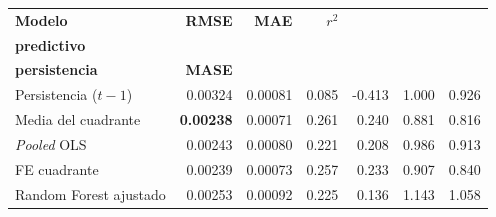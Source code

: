 \begin{tabular}{l r r r r r r}
\toprule
\textbf{Modelo} & \textbf{RMSE} & \textbf{MAE} & \textbf{$r^2$} & \makecell[c]{\textbf{$R^2$}\\\textbf{predictivo}} & \makecell[c]{\textbf{MAE rel.}\\\textbf{persistencia}} & \textbf{MASE} \\
\midrule
Persistencia ($t-1$) & 0.00324 & 0.00081 & 0.085 & -0.413 & 1.000 & 0.926 \\
Media del cuadrante & \textbf{0.00238} & 0.00071 & 0.261 & 0.240 & 0.881 & 0.816 \\
\emph{Pooled} OLS & 0.00243 & 0.00080 & 0.221 & 0.208 & 0.986 & 0.913 \\
FE cuadrante & 0.00239 & 0.00073 & 0.257 & 0.233 & 0.907 & 0.840 \\
Random Forest ajustado & 0.00253 & 0.00092 & 0.225 & 0.136 & 1.143 & 1.058 \\
\bottomrule
\end{tabular}

